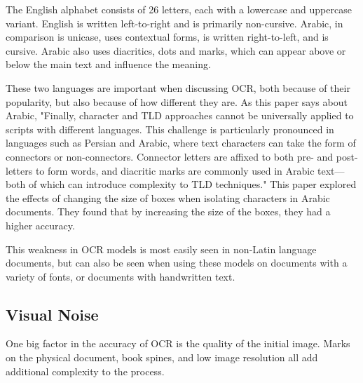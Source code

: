 \documentclass[sigplan,screen,nonacm]{acmart-tagged}
\begin{document}
The English alphabet consists of 26 letters, each with a lowercase and uppercase variant. English is written left-to-right and is primarily non-cursive.
Arabic, in comparison is unicase, uses contextual forms, is written right-to-left, and is cursive. Arabic also uses diacritics, dots and marks, which can appear above or below the main text and influence the meaning.

These two languages are important when discussing OCR, both because of their popularity, but also because of how different they are. As this paper\cite{Fateh:2024} says about Arabic, "Finally, character and TLD approaches cannot be universally applied to scripts with different languages. This challenge is particularly pronounced in languages such as Persian and Arabic, where text characters can take the form of connectors or non-connectors. Connector letters are affixed to both pre- and post-letters to form words, and diacritic marks are commonly used in Arabic text—both of which can introduce complexity to TLD techniques." This paper explored the effects of changing the size of boxes when isolating characters in Arabic documents. They found that by increasing the size of the boxes, they had a higher accuracy. 



This weakness in OCR models is most easily seen in non-Latin language documents, but can also be seen when using these models on documents with a variety of fonts, or documents with handwritten text. 

\subsection{Visual Noise}
\label{Noise}

One big factor in the accuracy of OCR is the quality of the initial image. Marks on the physical document, book spines, and low image resolution all add additional complexity to the process. 
\end{document}
